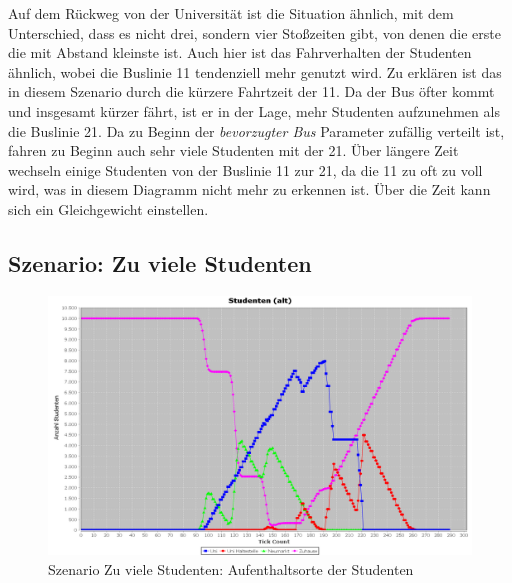 \documentclass[12pt,a4paper]{scrartcl}
\begin{document}
Auf dem Rückweg von der Universität ist die Situation ähnlich, mit dem Unterschied, dass es nicht drei, sondern vier Stoßzeiten gibt, von denen die erste die mit Abstand kleinste ist. Auch hier ist das Fahrverhalten der Studenten ähnlich, wobei die Buslinie 11 tendenziell mehr genutzt wird. 
Zu erklären ist das in diesem Szenario durch die kürzere Fahrtzeit der 11. Da der Bus öfter kommt und insgesamt kürzer fährt, ist er in der Lage, mehr Studenten aufzunehmen als die Buslinie 21. Da zu Beginn der \textit{bevorzugter Bus} Parameter zufällig verteilt ist, fahren zu Beginn auch sehr viele Studenten mit der 21. Über längere Zeit wechseln einige Studenten von der Buslinie 11 zur 21, da die 11 zu oft zu voll wird, was in diesem Diagramm nicht mehr zu erkennen ist. Über die Zeit kann sich ein Gleichgewicht einstellen.

\subsection{Szenario: Zu viele Studenten}\label{s2}

\begin{figure}
\includegraphics[scale=0.4]{Viele_Studenten_Aufenthaltsorte.png}
\caption{Szenario \glqq Zu viele Studenten\grqq : Aufenthaltsorte der Studenten}
\label{s2g1}
\end{figure}
\end{document}
